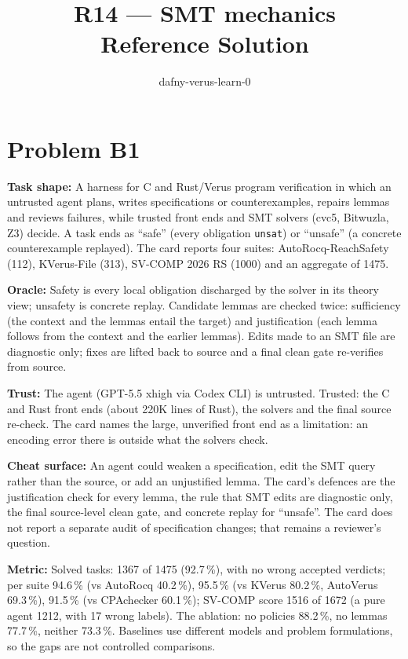 \documentclass[11pt]{article}
\title{R14 --- SMT mechanics \\ \large Reference Solution}
\author{dafny-verus-learn-0}
\date{}
\begin{document}
\maketitle
\section*{Problem B1}\label{ans:B1}
\begin{answer}
\textbf{Task shape:} A harness for C and Rust/Verus program verification in which an untrusted agent plans, writes specifications or counterexamples, repairs lemmas and reviews failures, while trusted front ends and SMT solvers (cvc5, Bitwuzla, Z3) decide. A task ends as ``safe'' (every obligation \texttt{unsat}) or ``unsafe'' (a concrete counterexample replayed). The card reports four suites: AutoRocq-ReachSafety (112), KVerus-File (313), SV-COMP 2026 RS (1000) and an aggregate of 1475.

\textbf{Oracle:} Safety is every local obligation discharged by the solver in its theory view; unsafety is concrete replay. Candidate lemmas are checked twice: sufficiency (the context and the lemmas entail the target) and justification (each lemma follows from the context and the earlier lemmas). Edits made to an SMT file are diagnostic only; fixes are lifted back to source and a final clean gate re-verifies from source.

\textbf{Trust:} The agent (GPT-5.5 xhigh via Codex CLI) is untrusted. Trusted: the C and Rust front ends (about 220K lines of Rust), the solvers and the final source re-check. The card names the large, unverified front end as a limitation: an encoding error there is outside what the solvers check.

\textbf{Cheat surface:} An agent could weaken a specification, edit the SMT query rather than the source, or add an unjustified lemma. The card's defences are the justification check for every lemma, the rule that SMT edits are diagnostic only, the final source-level clean gate, and concrete replay for ``unsafe''. The card does not report a separate audit of specification changes; that remains a reviewer's question.

\textbf{Metric:} Solved tasks: 1367 of 1475 (92.7\,\%), with no wrong accepted verdicts; per suite 94.6\,\% (vs AutoRocq 40.2\,\%), 95.5\,\% (vs KVerus 80.2\,\%, AutoVerus 69.3\,\%), 91.5\,\% (vs CPAchecker 60.1\,\%); SV-COMP score 1516 of 1672 (a pure agent 1212, with 17 wrong labels). The ablation: no policies 88.2\,\%, no lemmas 77.7\,\%, neither 73.3\,\%. Baselines use different models and problem formulations, so the gaps are not controlled comparisons.


\end{answer}
\end{document}
